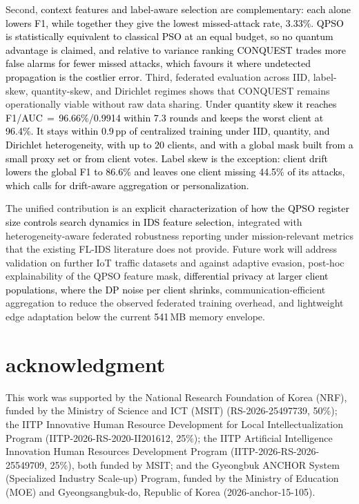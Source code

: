 \documentclass[conference]{IEEEtran}
\begin{document}
Second, \textcolor{black}{context features and label-aware
selection are complementary: each alone lowers F1, while together
they give the lowest missed-attack rate, 3.33\%. QPSO is
statistically equivalent to classical PSO at an equal budget, so
no quantum advantage is claimed, and relative to variance ranking
CONQUEST trades more false alarms for fewer missed attacks, which
favours it where undetected propagation is the costlier error.}
Third, federated evaluation across IID, label-skew,
quantity-skew, and Dirichlet regimes shows that CONQUEST
remains operationally viable without raw data sharing.
\textcolor{black}{Under quantity skew it reaches F1/AUC\,$=$\,96.66\%/0.9914
within 7.3 rounds and keeps the worst client at 96.4\%. It stays
within 0.9\,pp of centralized training under IID, quantity, and
Dirichlet heterogeneity, with up to 20 clients, and with a global
mask built from a small proxy set or from client votes. Label skew is the exception: client drift lowers the global
F1 to 86.6\% and leaves one client missing 44.5\% of its attacks,
which calls for drift-aware aggregation or personalization.}

The unified contribution is an \textcolor{black}{explicit
characterization of how the QPSO register size controls search
dynamics in IDS feature selection}, integrated with heterogeneity-aware
federated robustness reporting under mission-relevant
metrics that the existing FL-IDS literature does not provide.
Future work will address validation on further IoT traffic datasets
and against adaptive evasion, post-hoc
explainability of the QPSO feature mask, \textcolor{black}{differential privacy at
larger client populations, where the DP noise per client shrinks,} communication-efficient aggregation to
reduce the observed federated
training overhead, and lightweight edge adaptation below
the current \textcolor{black}{541}\,MB memory envelope.








\section *{\textbf{acknowledgment}}
\vspace{-0.2cm}
This work was supported by the National Research Foundation of Korea (NRF), funded by the Ministry of Science and ICT (MSIT) (RS-2026-25497739, 50\%); the IITP Innovative Human Resource Development for Local Intellectualization Program (IITP-2026-RS-2020-II201612, 25\%); the IITP Artificial Intelligence Innovation Human Resources Development Program (IITP-2026-RS-2026-25549709, 25\%), both funded by MSIT; and the Gyeongbuk ANCHOR System (Specialized Industry Scale-up) Program, funded by the Ministry of Education (MOE) and Gyeongsangbuk-do, Republic of Korea (2026-anchor-15-105).

\balance




\end{document}
